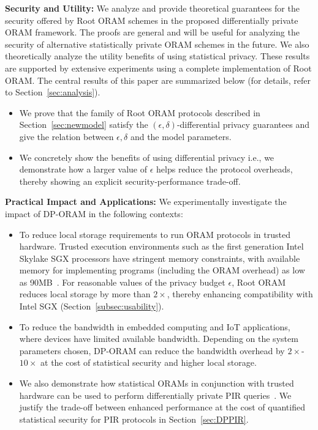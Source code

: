 \documentclass[USenglish,oneside,twocolumn]{article}
\newcommand{\ourprotocol}{Root ORAM}
\begin{document}
\textbf{Security and Utility: }We analyze and provide theoretical guarantees for 
the security offered by \ourprotocol{} schemes in the proposed differentially private 
ORAM framework. The proofs are general and will be useful for analyzing 
the security of alternative statistically private ORAM schemes in the future. 
We also theoretically analyze the utility benefits of using statistical privacy. 
These results are supported by extensive experiments using a complete implementation 
of \ourprotocol{}. The central results of this paper are summarized below (for details, refer to Section~\ref{sec:analysis}). 
\vspace{-6pt} 
\begin{itemize}
\itemsep0em
\item We prove that the family of \ourprotocol{} protocols 
described in Section~\ref{sec:newmodel} satisfy the $(\epsilon, \delta)$-differential 
privacy guarantees and give the relation between $\epsilon, \delta$ and the model parameters.
\item We concretely show the benefits of using differential privacy i.e., we demonstrate 
how a larger value of $\epsilon$ helps reduce the protocol overheads, thereby showing 
an explicit security-performance trade-off.
\end{itemize}
\vspace{-6pt} 


\textbf{Practical Impact and Applications:} We experimentally investigate the impact of DP-ORAM in the following contexts:
\vspace{-6pt} 
\begin{itemize}
\itemsep0em
\item To reduce local storage requirements to run ORAM protocols 
in trusted hardware. Trusted execution environments such as the first 
generation Intel Skylake SGX processors have stringent memory constraints, 
with available memory for implementing programs (including the ORAM overhead) as low as 90MB~\cite{ohrimenko2016oblivious}. 
For reasonable values of the privacy budget $\epsilon$, \ourprotocol{} reduces 
local storage by more than $2\times$, thereby enhancing compatibility with Intel SGX (Section~\ref{subsec:usability}).
\item To reduce the bandwidth in embedded computing and IoT applications, 
where devices have limited available bandwidth. Depending on the system 
parameters chosen, DP-ORAM can reduce the bandwidth overhead by $2\times$-$10\times$ at 
the cost of statistical security and higher local storage. 
\item We also demonstrate how statistical ORAMs in conjunction with trusted 
hardware can be used to perform differentially private PIR queries~\cite{goldbergDPPIR}. 
We justify the trade-off between enhanced performance at the cost of 
quantified statistical security for PIR protocols in Section~\ref{sec:DPPIR}.
\end{itemize}
\vspace{-6pt} 
\end{document}
